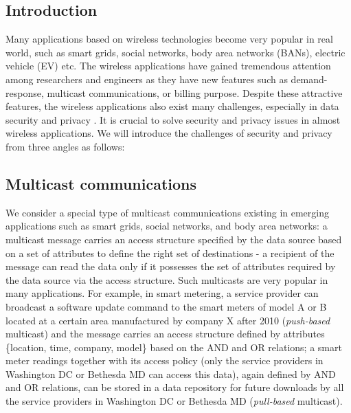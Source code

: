 \documentclass[letterpaper,12pt]{article}
\begin{document}
   \newpage
   \setcounter{page}{1}
   \setcounter{section}{1}
   \begin{singlespace}
       \section{Introduction}
   \end{singlespace}
   \setcounter{section}{1}
   \doublespacing
Many applications based on wireless technologies become very popular in real world, such as smart grids, social networks, body area networks (BANs), electric vehicle (EV) etc.  The wireless applications have gained tremendous attention among researchers and engineers as they have new features such as demand-response, multicast communications, or billing purpose. Despite these attractive features, the wireless applications also exist many challenges, especially in data security and privacy \cite{rial2011privacy, popa2009vpriv, jorns2007privacy, ma2013privacy, erkin2012private, lagendijk2013encrypted, anderson2010security, buttyan2007security, hu2013body, su2009ocast}. It is crucial to solve security and privacy issues in almost wireless applications. We will introduce the challenges of security and privacy from three angles as follows:


\subsection{Multicast communications}

We consider a special type of multicast communications existing in emerging applications such as smart grids, social networks, and body area networks:  a multicast message carries an access structure specified by the data source based on a set of attributes to define the right set of destinations - a recipient of the message can read the data only if it possesses the set of attributes required by the data source via the access structure. Such multicasts are very popular in many applications. For example, in smart metering, a service provider can broadcast a software update command to the smart meters of model A or B located at a certain area manufactured by company X after 2010 (\emph{push-based} multicast) and the message carries an access structure defined by attributes \{location, time, company, model\} based on the  AND and OR relations; a smart meter readings together with its access policy (only the service providers in Washington DC or Bethesda MD can access this data), again defined by AND and OR relations, can be stored in a data repository for future downloads by all the service providers in Washington DC or Bethesda MD (\emph{pull-based} multicast).
\end{document}
